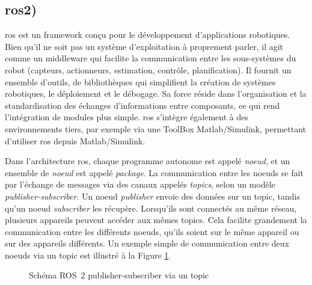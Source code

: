 \subsection{\gls{ros2}) \cite{noauthor_ros_nodate}}
\label{partie:ros}

\gls{ros} est un framework conçu pour le développement d'applications robotiques. Bien qu’il ne soit pas un système d’exploitation à proprement parler, il agit comme un middleware qui facilite la communication entre les sous-systèmes du robot (capteurs, actionneurs, estimation, contrôle, planification). Il fournit un ensemble d’outils, de bibliothèques qui simplifient la création de systèmes robotiques, le déploiement et le débogage. Sa force réside dans l’organisation et la standardisation des échanges d’informations entre composants, ce qui rend l’intégration de modules plus simple. \gls{ros} s’intègre également à des environnements tiers, par exemple via une ToolBox Matlab/Simulink, permettant d’utiliser \gls{ros} depuis Matlab/Simulink.

Dans l'architecture \gls{ros}, chaque programme autonome est appelé \textit{noeud}, et un ensemble de \textit{noeud} est appelé \textit{package}. La communication entre les noeuds se fait par l'échange de messages via des canaux appelés \textit{topics}, selon un modèle \textit{publisher-subscriber}. Un noeud \textit{publisher} envoie des données sur un topic, tandis qu'un noeud \textit{subscriber} les récupère. Lorsqu’ils sont connectés au même réseau, plusieurs appareils peuvent accéder aux mêmes topics. Cela facilite grandement la communication entre les différents noeuds, qu'ils soient sur le même appareil ou sur des appareils différents. Un exemple simple de communication entre deux noeuds via un topic est illustré à la Figure \ref{fig:ros2_topic}.

\begin{figure}[htbp]
    \centering
    \caption{Schéma ROS~2 publisher-subscriber via un topic}
    \label{fig:ros2_topic}
\end{figure}


